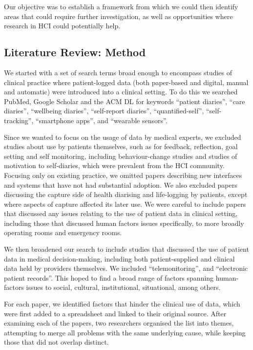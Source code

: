 \documentclass{sigchi}
\begin{document}
 Our objective  was to establish a framework from which we could then identify areas that could require further investigation, as well as opportunities where research in HCI could potentially help.  

\subsection{Literature Review: Method}

We started with a set of search terms broad enough to encompass studies of clinical practice where patient-logged data (both paper-based and digital, manual and automatic) were introduced into a clinical setting.  To do this we searched PubMed, Google Scholar and the ACM DL for keywords ``patient diaries'', ``care diaries'', ``wellbeing diaries'', ``self-report diaries'', ``quantified-self'', ``self-tracking'', ``smartphone apps'', and ``wearable sensors''.

Since we wanted to focus on the usage of data by medical experts, we excluded studies about use by patients themselves, such as for feedback, reflection, goal setting and self monitoring, including behaviour-change studies and studies of motivation to self-diaries, which were prevalent from the HCI community.   Focusing only on existing practice, we omitted papers describing new interfaces and systems that have not had substantial adoption.  We also excluded papers discussing the capture side of health diarising and life-logging by patients, except where aspects of capture affected its later use.  We were careful to include papers that discussed any issues relating to the use of patient data in clinical setting, including those that discussed human factors issues specifically, to more broadly operating rooms and emergency rooms.

We then broadened our search to include studies that discussed the use of patient data in medical decision-making, including both patient-supplied and clinical data held by providers themselves.  We included ``telemonitoring'', and ``electronic patient records''.  This  hoped to find a broad range of factors spanning human-factors issues to social, cultural, institutional, situational, among others.

For each paper, we identified factors that hinder the clinical use of data, which were first added to a spreadsheet and linked to their original source.  After examining each of the papers, two researchers organised the list into themes, attempting to merge all problems with the same underlying cause, while keeping those that did not overlap distinct.  %
\end{document}
